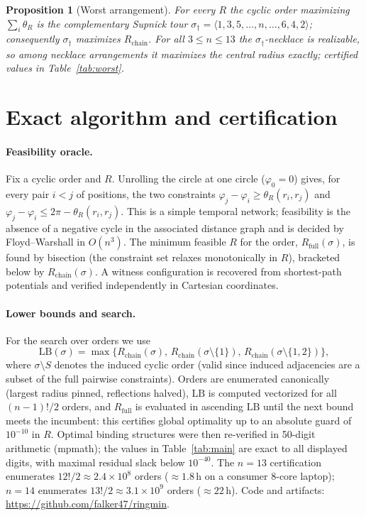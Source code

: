 \documentclass[11pt]{article}
\newtheorem{proposition}[theorem]{Proposition}
\theoremstyle{definition}
\theoremstyle{remark}
\begin{document}
\begin{proposition}[Worst arrangement]\label{prop:worst}
For every $R$ the cyclic order maximizing $\sum_i\theta_R$ is the complementary Supnick tour $\sigma_\dagger=\langle1,3,5,\dots,n,\dots,6,4,2\rangle$; consequently $\sigma_\dagger$ maximizes $R_{\mathrm{chain}}$. For all $3\le n\le13$ the $\sigma_\dagger$-necklace is realizable, so among necklace arrangements it maximizes the central radius exactly; certified values in Table~\ref{tab:worst}.
\end{proposition}

\section{Exact algorithm and certification}\label{sec:algo}

\paragraph{Feasibility oracle.} Fix a cyclic order and $R$. Unrolling the circle at one circle ($\varphi_0=0$) gives, for every pair $i<j$ of positions, the two constraints $\varphi_j-\varphi_i\ge\theta_R(r_i,r_j)$ and $\varphi_j-\varphi_i\le2\pi-\theta_R(r_i,r_j)$. This is a simple temporal network; feasibility is the absence of a negative cycle in the associated distance graph and is decided by Floyd--Warshall in $O(n^3)$. The minimum feasible $R$ for the order, $R_{\mathrm{full}}(\sigma)$, is found by bisection (the constraint set relaxes monotonically in $R$), bracketed below by $R_{\mathrm{chain}}(\sigma)$. A witness configuration is recovered from shortest-path potentials and verified independently in Cartesian coordinates.

\paragraph{Lower bounds and search.} For the search over orders we use
\[
\mathrm{LB}(\sigma)=\max\big\{R_{\mathrm{chain}}(\sigma),\,R_{\mathrm{chain}}(\sigma\setminus\{1\}),\,R_{\mathrm{chain}}(\sigma\setminus\{1,2\})\big\},
\]
where $\sigma\setminus S$ denotes the induced cyclic order (valid since induced adjacencies are a subset of the full pairwise constraints). Orders are enumerated canonically (largest radius pinned, reflections halved), $\mathrm{LB}$ is computed vectorized for all $(n-1)!/2$ orders, and $R_{\mathrm{full}}$ is evaluated in ascending $\mathrm{LB}$ until the next bound meets the incumbent: this certifies global optimality up to an absolute guard of $10^{-10}$ in $R$. Optimal binding structures were then re-verified in 50-digit arithmetic (mpmath); the values in Table~\ref{tab:main} are exact to all displayed digits, with maximal residual slack below $10^{-40}$. The $n=13$ certification enumerates $12!/2\approx2.4\times10^8$ orders ($\approx1.8$\,h on a consumer 8-core laptop); $n=14$ enumerates $13!/2\approx3.1\times10^9$ orders ($\approx22$\,h). Code and artifacts: \url{https://github.com/falker47/ringmin}.
\end{document}
